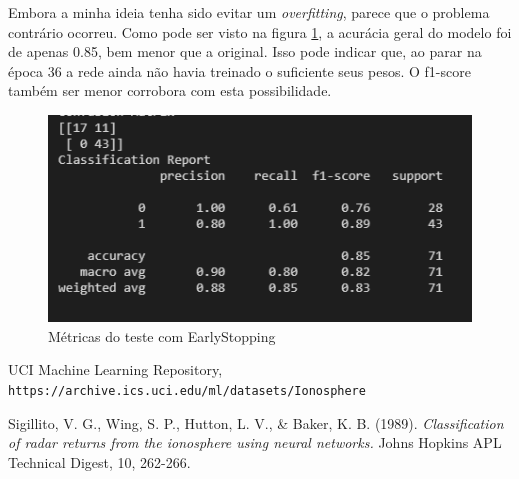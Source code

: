 \documentclass[12pt]{article}
\begin{document}
Embora a minha ideia tenha sido evitar um \textit{overfitting}, parece que o problema contrário ocorreu. Como pode ser visto na figura \ref{fig:metricasearly}, a acurácia geral do modelo foi de apenas 0.85, bem menor que a original. Isso pode indicar que, ao parar na época 36 a rede ainda não havia treinado o suficiente seus pesos. O f1-score também ser menor corrobora com esta possibilidade.
\begin{figure}[H]
	\centering
	\includegraphics[width=0.7\linewidth]{Imagens/earlystopping/metricasearly}
	\caption{Métricas do teste com EarlyStopping}
	\label{fig:metricasearly}
\end{figure}



\begin{thebibliography}{99} 
	
	UCI Machine Learning Repository,\\ \texttt{https://archive.ics.uci.edu/ml/datasets/Ionosphere}
	
	 Sigillito, V. G., Wing, S. P., Hutton, L. V., \& Baker, K. B. (1989). \textit{Classification of radar returns from the ionosphere using neural networks.} Johns Hopkins APL Technical Digest, 10, 262-266.
	
	
	
	
	
	
\end{thebibliography}
\end{document}
